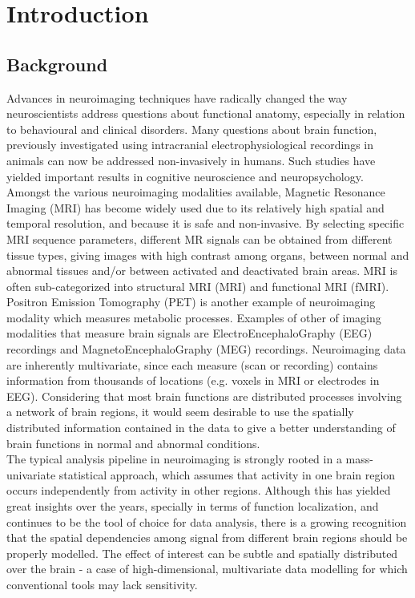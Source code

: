 
\chapter{Introduction}
\label{chap:intro}
\minitoc

\section{Background}

Advances in neuroimaging techniques have radically changed the way neuroscientists address questions about functional anatomy, especially in relation to behavioural and clinical disorders. Many questions about brain function, previously investigated using intracranial electrophysiological recordings in animals can now be addressed non-invasively in humans. Such studies have yielded important results in cognitive neuroscience and neuropsychology. Amongst the various neuroimaging modalities available, Magnetic Resonance Imaging (MRI) has become widely used due to its relatively high spatial and temporal resolution, and because it is safe and non-invasive. By selecting specific MRI sequence parameters, different MR signals can be obtained from different tissue types, giving images with high contrast among organs, between normal and abnormal tissues and/or between activated and deactivated brain areas. MRI is often sub-categorized into structural MRI (MRI) and functional MRI (fMRI). Positron Emission Tomography (PET) is another example of neuroimaging modality which measures metabolic processes. Examples of other of imaging modalities that measure  brain signals are ElectroEncephaloGraphy (EEG) recordings and MagnetoEncephaloGraphy (MEG) recordings. Neuroimaging data are inherently multivariate, since each measure (scan or recording) contains information from thousands of locations (e.g. voxels in MRI or electrodes in EEG). Considering that most brain functions are distributed processes involving a network of brain regions, it would seem desirable to use the spatially distributed information contained in the data to give a better understanding of brain functions in normal and abnormal conditions.
\\

The typical analysis pipeline in neuroimaging is strongly rooted in a mass-univariate statistical approach, which assumes that activity in one brain region occurs independently from activity in other regions. Although this has yielded great insights over the years, specially in terms of function localization, and continues to be the tool of choice for data analysis, there is a growing recognition that the spatial dependencies among signal from different brain regions should be properly modelled. The effect of interest can be subtle and spatially distributed over the brain - a case of high-dimensional, multivariate data modelling for which conventional tools may lack sensitivity. 
\\

